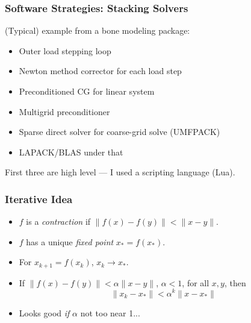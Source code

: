 \documentclass{beamer}
\begin{document}
\begin{frame}
  \frametitle{Software Strategies: Stacking Solvers}

  (Typical) example from a bone modeling package:
  \begin{itemize}
  \item Outer load stepping loop
  \item Newton method corrector for each load step
  \item Preconditioned CG for linear system
  \item Multigrid preconditioner
  \item Sparse direct solver for coarse-grid solve (UMFPACK)
  \item LAPACK/BLAS under that
  \end{itemize}

  \vspace{5mm}
  First three are high level --- I used a scripting language (Lua).

\end{frame}


\begin{frame}
  \frametitle{Iterative Idea}

  \begin{center}
    
  \end{center}

  \begin{itemize}
  \item
    $f$ is a {\em contraction} if $\|f(x)-f(y)\| < \|x-y\|$.
  \item
    $f$ has a unique {\em fixed point} $x_* = f(x_*)$.
  \item
    For $x_{k+1} = f(x_k)$, $x_k \rightarrow x_*$.
  \item
    If $\|f(x)-f(y)\| < \alpha \|x-y\|$, $\alpha < 1$, for all $x, y$, then
    \[
      \|x_k-x_*\| < \alpha^k \|x-x_*\|
    \]
  \item Looks good {\em if} $\alpha$ not too near 1...
  \end{itemize}
\end{frame}
\end{document}
